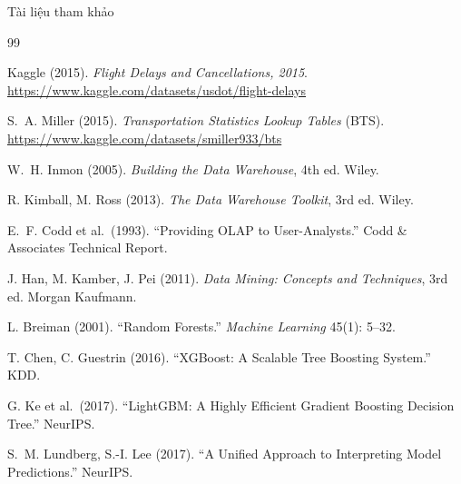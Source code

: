 \begin{frame}[t,allowframebreaks]{Tài liệu tham khảo}
\footnotesize
\raggedright
\begin{thebibliography}{99}

Kaggle (2015).
\textit{Flight Delays and Cancellations, 2015}.
\url{https://www.kaggle.com/datasets/usdot/flight-delays}

S.~A. Miller (2015).
\textit{Transportation Statistics Lookup Tables} (BTS).
\url{https://www.kaggle.com/datasets/smiller933/bts}

W.~H. Inmon (2005).
\textit{Building the Data Warehouse}, 4th ed. Wiley.

R. Kimball, M. Ross (2013).
\textit{The Data Warehouse Toolkit}, 3rd ed. Wiley.

E.~F. Codd et al.\ (1993).
``Providing OLAP to User-Analysts.'' Codd \& Associates Technical Report.

J. Han, M. Kamber, J. Pei (2011).
\textit{Data Mining: Concepts and Techniques}, 3rd ed. Morgan Kaufmann.

L. Breiman (2001).
``Random Forests.'' \textit{Machine Learning} 45(1): 5--32.

T. Chen, C. Guestrin (2016).
``XGBoost: A Scalable Tree Boosting System.'' KDD.

G. Ke et al.\ (2017).
``LightGBM: A Highly Efficient Gradient Boosting Decision Tree.'' NeurIPS.

S.~M. Lundberg, S.-I. Lee (2017).
``A Unified Approach to Interpreting Model Predictions.'' NeurIPS.

\end{thebibliography}
\end{frame}
